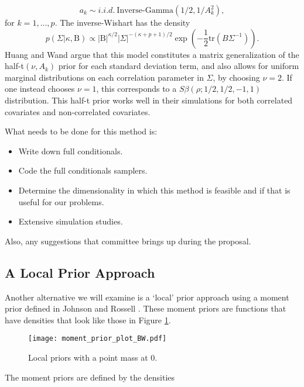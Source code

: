 \begin{equation}
a_k \sim i.i.d.\ \text{Inverse-Gamma}(1/2,1/A_k^2),
\end{equation} 
for $k=1,\dots,p$.  
The inverse-Wishart has the density 
\begin{equation}
p(\Sigma \vert \kappa, \text{B})\propto \vert \text{B}\vert^{\kappa/2}\vert\Sigma\vert^{-(\kappa+p+1)/2}\exp{(-\frac{1}{2}\text{tr}(B\Sigma^{-1}))}.
\end{equation}
Huang and Wand \cite{huang2013simple} argue that this model constitutes a matrix generalization of the half-t$(\nu, A_k)$ prior for each standard deviation term, and also allows for uniform marginal distributions on each correlation parameter in $\Sigma$, by choosing $\nu=2$. If one instead chooses $\nu=1$, this corresponds to a $S\beta(\rho;1/2,1/2,-1,1)$ distribution. This half-t prior works well in their simulations for both correlated covariates and non-correlated covariates.  

What needs to be done for this method is: 

\begin{itemize}
\item Write down full conditionals.
\item Code the full conditionals samplers. 
\item Determine the dimensionality in which this method is feasible and if that is useful for our problems.
\item Extensive simulation studies. 
\end{itemize}
Also, any suggestions that committee brings up during the proposal.

\subsection{A Local Prior Approach}

Another alternative we will examine is a `local' prior approach using a moment prior defined in Johnson and Rossell \cite{johnson2010use}. These moment priors are functions that have densities that look like those in Figure \ref{fig:local_priors}.

\begin{figure}[h]
  \centering
    \texttt{[image: moment\_prior\_plot\_BW.pdf]}
    \caption[Local priors with a point mass at 0]{Local priors with a point mass at 0.}
  \label{fig:local_priors}
\end{figure}

The moment priors are defined by the densities 

